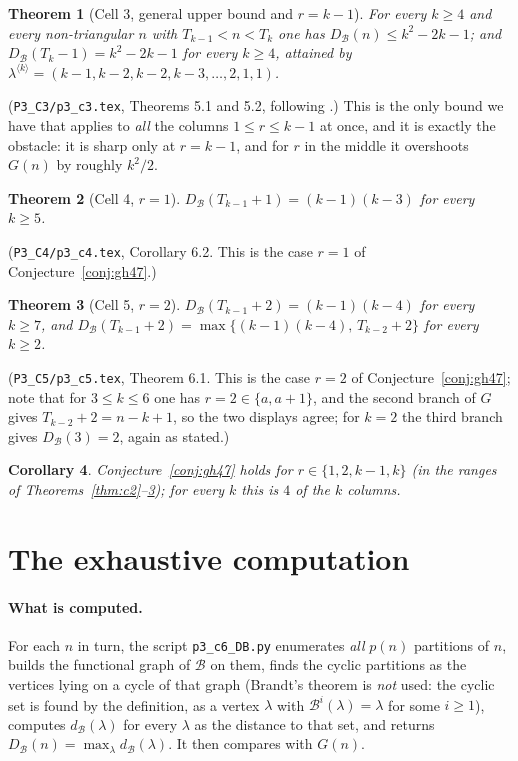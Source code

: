 \documentclass[11pt]{article}
\newtheorem{theorem}{Theorem}[section]
\newtheorem{corollary}[theorem]{Corollary}
\theoremstyle{definition}
\newcommand{\B}{\mathcal{B}}
\newcommand{\dB}{d_{\mathcal{B}}}
\newcommand{\DB}{D_{\mathcal{B}}}
\renewcommand{\le}{\leqslant}
\renewcommand{\ge}{\geqslant}
\begin{document}
\begin{theorem}[Cell 3, general upper bound and $r=k-1$]\label{thm:c3}
For every $k\ge4$ and every non-triangular $n$ with $T_{k-1}<n<T_k$ one has $\DB(n)\le k^2-2k-1$; and
$\DB(T_k-1)=k^2-2k-1$ for every $k\ge4$, attained by
$\lambda^{\langle k\rangle}=(k-1,k-2,k-2,k-3,\dots,2,1,1)$.
\end{theorem}
\noindent(\texttt{P3\_C3/p3\_c3.tex}, Theorems 5.1 and 5.2, following \cite[Thm.~4.4]{GH98}.)  This is the only
bound we have that applies to \emph{all} the columns $1\le r\le k-1$ at once, and it is exactly the obstacle: it
is sharp only at $r=k-1$, and for $r$ in the middle it overshoots $G(n)$ by roughly $k^2/2$.

\begin{theorem}[Cell 4, $r=1$]\label{thm:c4}
$\DB(T_{k-1}+1)=(k-1)(k-3)$ for every $k\ge5$.
\end{theorem}
\noindent(\texttt{P3\_C4/p3\_c4.tex}, Corollary 6.2.  This is the case $r=1$ of Conjecture~\ref{conj:gh47}.)

\begin{theorem}[Cell 5, $r=2$]\label{thm:c5}
$\DB(T_{k-1}+2)=(k-1)(k-4)$ for every $k\ge7$, and
$\DB(T_{k-1}+2)=\max\{(k-1)(k-4),\,T_{k-2}+2\}$ for every $k\ge2$.
\end{theorem}
\noindent(\texttt{P3\_C5/p3\_c5.tex}, Theorem 6.1.  This is the case $r=2$ of Conjecture~\ref{conj:gh47}; note that
for $3\le k\le6$ one has $r=2\in\{a,a+1\}$, and the second branch of $G$ gives $T_{k-2}+2=n-k+1$, so the two
displays agree; for $k=2$ the third branch gives $\DB(3)=2$, again as stated.)

\begin{corollary}\label{cor:proved-columns}
Conjecture~\ref{conj:gh47} holds for $r\in\{1,2,k-1,k\}$ (in the ranges of
Theorems~\ref{thm:c2}--\ref{thm:c5}); for every $k$ this is $4$ of the $k$ columns.
\end{corollary}

\section{The exhaustive computation}\label{sec:comp}

\paragraph{What is computed.}  For each $n$ in turn, the script \texttt{p3\_c6\_DB.py} enumerates \emph{all} $p(n)$
partitions of $n$, builds the functional graph of $\B$ on them, finds the cyclic partitions as the vertices lying on
a cycle of that graph (Brandt's theorem is \emph{not} used: the cyclic set is found by the definition, as a vertex
$\lambda$ with $\B^i(\lambda)=\lambda$ for some $i\ge1$), computes $\dB(\lambda)$ for every $\lambda$ as the
distance to that set, and returns $\DB(n)=\max_\lambda \dB(\lambda)$.  It then compares with $G(n)$.
\end{document}
